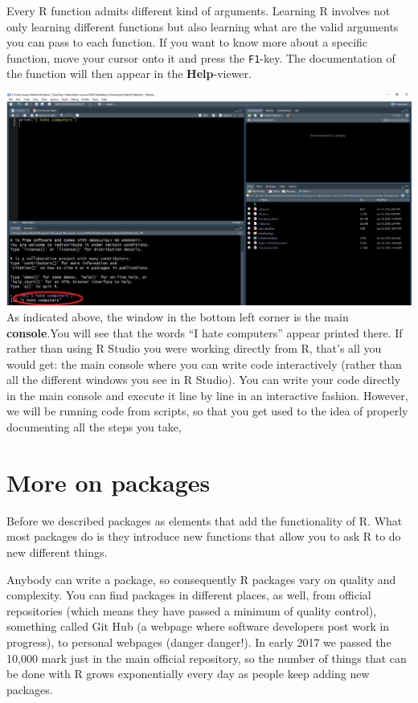 \documentclass[]{book}
\begin{document}
Every R function admits different kind of arguments. Learning R involves not only learning different functions but also learning what are the valid arguments you can pass to each function. If you want to know more about a specific function, move your cursor onto it and press the \texttt{F1}-key. The documentation of the function will then appear in the \textbf{Help}-viewer.

\includegraphics{img/consoleresults.png}
As indicated above, the window in the bottom left corner is the main \textbf{console}.You will see that the words ``I hate computers'' appear printed there. If rather than using R Studio you were working directly from R, that's all you would get: the main console where you can write code interactively (rather than all the different windows you see in R Studio). You can write your code directly in the main console and execute it line by line in an interactive fashion. However, we will be running code from scripts, so that you get used to the idea of properly documenting all the steps you take,

\hypertarget{more-on-packages}{%
\section{More on packages}\label{more-on-packages}}

Before we described packages as elements that add the functionality of R. What most packages do is they introduce new functions that allow you to ask R to do new different things.

Anybody can write a package, so consequently R packages vary on quality and complexity. You can find packages in different places, as well, from official repositories (which means they have passed a minimum of quality control), something called Git Hub (a webpage where software developers post work in progress), to personal webpages (danger danger!). In early 2017 we passed the 10,000 mark just in the main official repository, so the number of things that can be done with R grows exponentially every day as people keep adding new packages.
\end{document}
